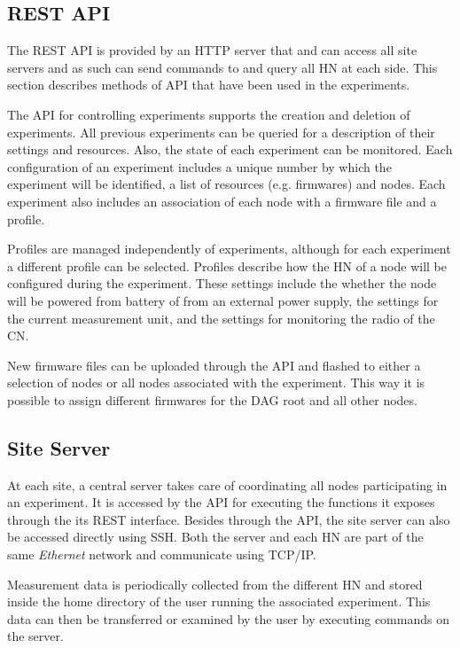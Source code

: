 \subsection{REST API}

The \ac{REST} \ac{API} is provided by an \ac{HTTP} server that and can access
all site servers and as such can send commands to and query all \ac{HN} at
each side. This section describes methods of \ac{API} that have been used in the
experiments.

The \ac{API} for controlling experiments supports the creation and deletion of
experiments. All previous experiments can be queried for a description of their
settings and resources. Also, the state of each experiment can be monitored.
Each configuration of an experiment includes a unique number by which the
experiment will be identified, a list of resources (e.g. firmwares) and nodes.
Each experiment also includes an association of each node with a firmware file
and a profile.

Profiles are managed independently of experiments, although for each experiment a
different profile can be selected. Profiles describe how the \ac{HN} of a node
will be configured during the experiment. These settings include the whether the
node will be powered from battery of from an external power supply, the settings
for the current measurement unit, and the settings for monitoring the radio of
the \ac{CN}.

New firmware files can be uploaded through the \ac{API} and flashed to either a
selection of nodes or all nodes associated with the experiment. This way it is
possible to assign different firmwares for the \ac{DAG} root and all other
nodes.

\subsection{Site Server}

At each site, a central server takes care of coordinating all nodes
participating in an experiment. It is accessed by the \ac{API} for executing the
functions it exposes through the its \ac{REST} interface. Besides through the
\ac{API}, the site server can also be accessed directly using \ac{SSH}. Both the
server and each \ac{HN} are part of the same \emph{Ethernet} network and
communicate using \ac{TCP}/\ac{IP}.

Measurement data is periodically collected from the different \ac{HN} and stored
inside the home directory of the user running the associated experiment. This
data can then be transferred or examined by the user by executing commands on
the server.
